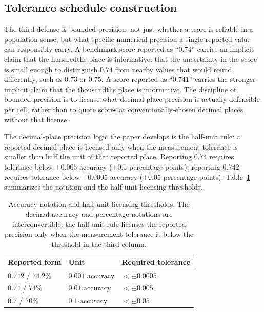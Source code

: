 \documentclass[11pt]{article}
\begin{document}
\subsection{Tolerance schedule construction}
\label{sec:tolerance-schedule}


The third defense is bounded precision: not just whether a score is
reliable in a population sense, but what specific numerical
precision a single reported value can responsibly carry. A
benchmark score reported as ``$0.74$'' carries an implicit claim
that the hundredths place is informative: that the uncertainty in
the score is small enough to distinguish $0.74$ from nearby values
that would round differently, such as $0.73$ or $0.75$. A score
reported as ``$0.741$'' carries the stronger implicit claim that
the thousandths place is informative. The discipline of bounded
precision is to license what decimal-place precision is actually
defensible per cell, rather than to quote scores at
conventionally-chosen decimal places without that license.

The decimal-place precision logic the paper develops is the
half-unit rule: a reported decimal place is licensed only when the
measurement tolerance is smaller than half the unit of that
reported place. Reporting $0.74$ requires tolerance below $\pm
0.005$ accuracy ($\pm 0.5$ percentage points); reporting $0.742$
requires tolerance below $\pm 0.0005$ accuracy ($\pm 0.05$
percentage points). Table~\ref{tab:notation-thresholds} summarizes
the notation and the half-unit licensing thresholds.

\begin{table}[h]
\centering
\small
\caption{Accuracy notation and half-unit licensing thresholds. The decimal-accuracy and percentage notations are interconvertible; the half-unit rule licenses the reported precision only when the measurement tolerance is below the threshold in the third column.}
\label{tab:notation-thresholds}
\begin{tabular}{lll}
\toprule
Reported form & Unit & Required tolerance \\
\midrule
$0.742$ / $74.2\%$ & $0.001$ accuracy & $< \pm 0.0005$ \\
$0.74$ / $74\%$ & $0.01$ accuracy & $< \pm 0.005$ \\
$0.7$ / $70\%$ & $0.1$ accuracy & $< \pm 0.05$ \\
\bottomrule
\end{tabular}
\end{table}
\end{document}
